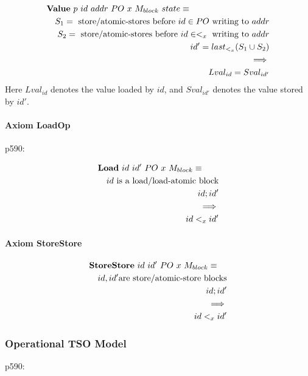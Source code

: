\begin{eqnarray*}
\lefteqn{\mathbf{Value}~p~id~addr~PO~x~ M_{block}~state \equiv {}}
\\&& S_1 = \mbox{ store/atomic-stores before }
           id \in PO
           \mbox{ writing to }
           addr
\\&& S_2  = \mbox{ store/atomic-stores before }
           id \in <_x
           \mbox{ writing to }
           addr
\\&& id' = last_{<_x}(S_1 \cup S_2)
\\&& \implies
\\&& Lval_{id} = Sval_{id'}
\end{eqnarray*}
Here $Lval_{id}$ denotes the value loaded by $id$,
and $Sval_{id'}$ denotes the value stored by $id'$.

\paragraph{Axiom LoadOp}

p590:

\begin{eqnarray*}
\lefteqn{\mathbf{Load}~id~id'~PO~x~ M_{block} \equiv {}}
\\&& id \mbox{ is a load/load-atomic block}
\\&& id ; id'
\\&&\implies
\\&& id <_x id'
\end{eqnarray*}

\paragraph{Axiom StoreStore}

\begin{eqnarray*}
\lefteqn{\mathbf{StoreStore}~id~id'~PO~x~ M_{block} \equiv {}}
\\&& id,id' \mbox{are store/atomic-store blocks}
\\&& id;id'
\\&&\implies
\\&& id <_x id'
\end{eqnarray*}

\subsubsection{Operational TSO Model}

p590:

